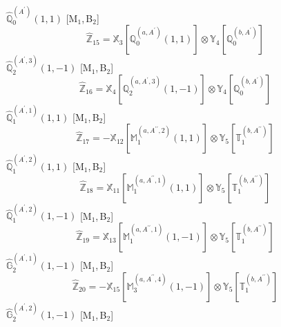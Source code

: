 \documentclass[fleqn,10pt,landscape]{article}
\begin{document}
\begin{itemize}
\begin{dmath*}
\end{dmath*}
\vspace{4mm}
\noindent {} $\,\,\,\hat{\mathbb{Q}}_{0}^{(A^{\prime})}(1,1)$ [M$_{1}$,\,B$_{2}$]
\begin{dmath*}
\hat{\mathbb{Z}}_{15}=\mathbb{X}_{3}[\mathbb{Q}_{0}^{(a,A^{\prime})}(1,1)] \otimes\mathbb{Y}_{4}[\mathbb{Q}_{0}^{(b,A^{\prime})}]
\end{dmath*}
\vspace{4mm}
\noindent {} $\,\,\,\hat{\mathbb{Q}}_{2}^{(A^{\prime},3)}(1,-1)$ [M$_{1}$,\,B$_{2}$]
\begin{dmath*}
\hat{\mathbb{Z}}_{16}=\mathbb{X}_{4}[\mathbb{Q}_{2}^{(a,A^{\prime},3)}(1,-1)] \otimes\mathbb{Y}_{4}[\mathbb{Q}_{0}^{(b,A^{\prime})}]
\end{dmath*}
\vspace{4mm}
\noindent {} $\,\,\,\hat{\mathbb{Q}}_{1}^{(A^{\prime},1)}(1,1)$ [M$_{1}$,\,B$_{2}$]
\begin{dmath*}
\hat{\mathbb{Z}}_{17}=- \mathbb{X}_{12}[\mathbb{M}_{1}^{(a,A^{\prime\prime},2)}(1,1)] \otimes\mathbb{Y}_{5}[\mathbb{T}_{1}^{(b,A^{\prime\prime})}]
\end{dmath*}
\vspace{4mm}
\noindent {} $\,\,\,\hat{\mathbb{Q}}_{1}^{(A^{\prime},2)}(1,1)$ [M$_{1}$,\,B$_{2}$]
\begin{dmath*}
\hat{\mathbb{Z}}_{18}=\mathbb{X}_{11}[\mathbb{M}_{1}^{(a,A^{\prime\prime},1)}(1,1)] \otimes\mathbb{Y}_{5}[\mathbb{T}_{1}^{(b,A^{\prime\prime})}]
\end{dmath*}
\vspace{4mm}
\noindent {} $\,\,\,\hat{\mathbb{Q}}_{1}^{(A^{\prime},2)}(1,-1)$ [M$_{1}$,\,B$_{2}$]
\begin{dmath*}
\hat{\mathbb{Z}}_{19}=\mathbb{X}_{13}[\mathbb{M}_{1}^{(a,A^{\prime\prime},1)}(1,-1)] \otimes\mathbb{Y}_{5}[\mathbb{T}_{1}^{(b,A^{\prime\prime})}]
\end{dmath*}
\vspace{4mm}
\noindent {} $\,\,\,\hat{\mathbb{G}}_{2}^{(A^{\prime},1)}(1,-1)$ [M$_{1}$,\,B$_{2}$]
\begin{dmath*}
\hat{\mathbb{Z}}_{20}=- \mathbb{X}_{15}[\mathbb{M}_{3}^{(a,A^{\prime\prime},4)}(1,-1)] \otimes\mathbb{Y}_{5}[\mathbb{T}_{1}^{(b,A^{\prime\prime})}]
\end{dmath*}
\vspace{4mm}
\noindent {} $\,\,\,\hat{\mathbb{G}}_{2}^{(A^{\prime},2)}(1,-1)$ [M$_{1}$,\,B$_{2}$]

\end{itemize}
\end{document}
